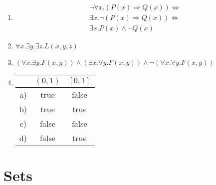 \documentclass{article}
\begin{document}
\begin{enumerate}
    \item
        \begin{align*}
            \lnot \forall x.(P(x) \Rightarrow Q(x)) \Leftrightarrow \\
            \exists x.\lnot (P(x) \Rightarrow Q(x)) \Leftrightarrow \\
            \exists x. P(x) \land \lnot Q(x)
        \end{align*}

    \item
        $ \forall x . \exists y . \exists z . L(x,y,z)$

    \item
        $(\forall x . \exists y . F(x,y)) \land (\exists x . \forall y . F(x,y)) \land \lnot (\forall x. \forall y . F(x,y))$

    \item
        \begin{tabular}{c | c | c}
             & $ (0,1) $ & $ [0,1] $ \\ \hline
            a) & true & false \\
            b) & true & true \\
            c) & false & false \\
            d) & false & true
        \end{tabular}
\end{enumerate}

\section{Sets}
\end{document}
